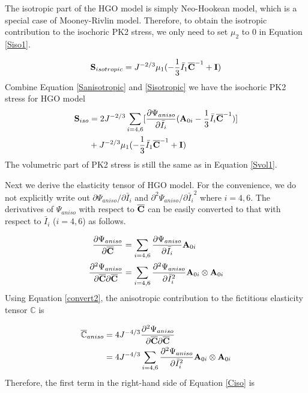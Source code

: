 The isotropic part of the HGO model is simply Neo-Hookean model, which is a special case of Mooney-Rivlin model. Therefore, to obtain the isotropic contribution to the isochoric PK2 stress, we only need to set $\mu_2$ to $0$ in Equation \ref{Siso1}.

\begin{equation} \label{Sisotropic}
\bold{S}_{isotropic} = J^{-2/3}\mu_1(-\frac{1}{3}\bar{I}_1\overline{\bold{C}}^{-1} + \bold{I})
\end{equation}
Combine Equation \ref{Sanisotropic} and \ref{Sisotropic} we have the isochoric PK2 stress for HGO model
\begin{equation} \label{HGOSiso}
\begin{split}
\bold{S}_{iso} 
&= 
2J^{-2/3} \sum_{i = 4, 6}[\frac{\partial{\Psi_{aniso}}}{\partial{\bar{I}_i}}  (\bold{A}_{0i} - \frac{1}{3}\bar{I}_i\overline{\bold{C}}^{-1})] \\
&+  J^{-2/3}\mu_1(-\frac{1}{3}\bar{I}_1\overline{\bold{C}}^{-1} + \bold{I})
\end{split}
\end{equation}
The volumetric part of PK2 stress is still the same as in Equation \ref{Svol1}.



Next we derive the elasticity tensor of HGO model. For the convenience, we do not explicitly write out ${\partial\Psi_{aniso}}/{\partial{\bar{I}_i}}$ and $\partial^2{\Psi_{aniso}}/\partial{\bar{I}_i}^2$ where $i = 4, 6$. The derivatives of $\Psi_{aniso}$ with respect to $\overline{\bold{C}}$ can be easily converted to that with respect to $\bar{I}_{i}$ ($i = 4, 6$) as follows.

\begin{subequations} \label{convert}
\begin{align}
\frac{\partial\Psi_{aniso}}{\partial\overline{\bold{C}}} 
&= \sum_{i = 4, 6}\frac{\partial\Psi_{aniso}}{\partial\bar{I}_i}\bold{A}_{0i} \label{convert1} \\
\frac{\partial^2\Psi_{aniso}}{\partial{\overline{\bold{C}}}\partial{\overline{\bold{C}}}} 
&= \sum_{i = 4, 6}\frac{\partial^2\Psi_{aniso}}{\partial{\bar{I}_i}^2}\bold{A}_{0i} \otimes \bold{A}_{0i} \label{convert2}
\end{align}
\end{subequations}
Using Equation \ref{convert2}, the anisotropic contribution to the fictitious elasticity tensor $\mathbb{C}$ is

\begin{equation}
\begin{split}
\overline{\mathbb{C}}_{aniso} 
&= 4J^{-4/3}\frac{\partial^2\Psi_{aniso}}{\partial\overline{\bold{C}}\partial\overline{\bold{C}}} \\
&= 4J^{-4/3}\sum_{i = 4, 6}\frac{\partial^2\Psi_{aniso}}{\partial{\bar{I}_i}^2}\bold{A}_{0i} \otimes \bold{A}_{0i}
\end{split}
\end{equation}
Therefore, the first term in the right-hand side of Equation \ref{Ciso} is

